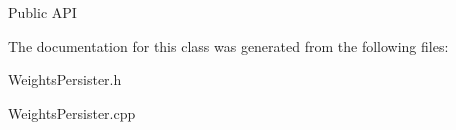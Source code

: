 \begin{DoxyParagraph}{Public A\-P\-I}

\end{DoxyParagraph}


The documentation for this class was generated from the following files\-:\begin{DoxyCompactItemize}
\item 
Weights\-Persister.\-h\item 
Weights\-Persister.\-cpp\end{DoxyCompactItemize}
